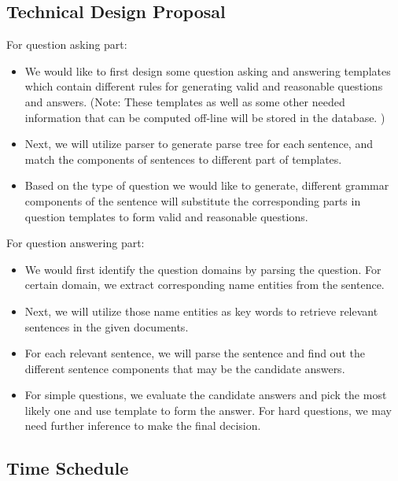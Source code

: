 \documentclass[a4page]{article}
\begin{document}
\subsection{Technical Design Proposal}
For question asking part:
\begin{itemize}
\item We would like to first design some question asking and answering templates which contain different rules for generating valid and reasonable questions and answers. (Note: These templates as well as some other needed information that can be computed off-line will be stored in the database. )
\item Next, we will utilize parser to generate parse tree for each sentence, and match the components of sentences to different part of templates.
\item Based on the type of question we would like to generate, different grammar components of the sentence will substitute the corresponding parts in question templates to form valid and reasonable questions.
\end{itemize}
For question answering part:
\begin{itemize}
\item We would first identify the question domains by parsing the question. For certain domain, we extract corresponding name entities from the sentence.
\item Next, we will utilize those name entities as key words to retrieve relevant sentences in the given documents.
\item For each relevant sentence, we will parse the sentence and find out the different sentence components that may be the candidate answers.
\item For simple questions, we evaluate the candidate answers and pick the most likely one and use template to form the answer. For hard questions, we may need further inference to make the final decision.
\end{itemize}


\subsection{Time Schedule}
\end{document}
